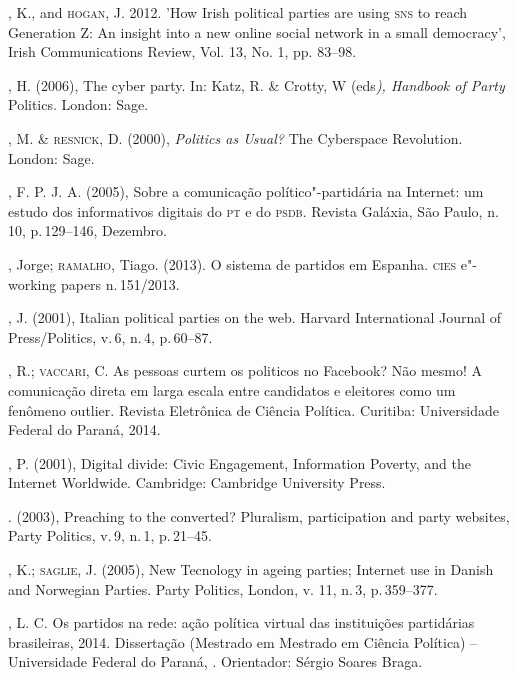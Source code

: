 \begin{bibliohedra}
, K., and \textsc{hogan}, J. 2012. 'How Irish political parties are using
\textsc{sns} to reach Generation Z: An insight into a new online social network
in a small democracy', Irish Communications Review, Vol. 13, No. 1, pp.
83--98.

, H. (2006), The cyber party. In: Katz, R. \& Crotty, W
(eds\textit{), Handbook of Party} Politics. London: Sage.

, M. \& \textsc{resnick}, D. (2000), \textit{Politics as Usual?} The
Cyberspace Revolution. London: Sage.

, F. P. J. A. (2005), Sobre a comunicação político"-partidária na
Internet: um estudo dos informativos digitais do \textsc{pt} e do \textsc{psdb}. Revista
Galáxia, São Paulo, n.\,10, p.\,129--146, Dezembro.

, Jorge; \textsc{ramalho}, Tiago. (2013). O sistema de partidos em Espanha.
\textsc{cies} e"-working papers n.\,151/2013. 


, J. (2001), Italian political parties on the web. Harvard
International Journal of Press/Politics, v.\,6, n.\,4, p.\,60--87.

, R.; \textsc{vaccari}, C. As pessoas curtem os politicos no Facebook? Não
mesmo! A comunicação direta em larga escala entre candidatos e eleitores
como um fenômeno outlier. Revista Eletrônica de Ciência Política.
Curitiba: Universidade Federal do Paraná, 2014.

, P. (2001), Digital divide: Civic Engagement, Information
Poverty, and the Internet Worldwide. Cambridge: Cambridge University
Press.

\titidem. (2003), Preaching to the converted? Pluralism, participation
and party websites, Party Politics, v.\,9, n.\,1, p.\,21--45.

, K.; \textsc{saglie}, J. (2005), New Tecnology in ageing parties;
Internet use in Danish and Norwegian Parties. Party Politics, London, v.
11, n.\,3, p.\,359--377.

, L. C. Os partidos na rede: ação política virtual das instituições
partidárias brasileiras, 2014. Dissertação (Mestrado em Mestrado em
Ciência Política) -- Universidade Federal do Paraná, . Orientador:
Sérgio Soares Braga.


\end{bibliohedra}
